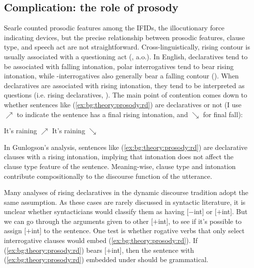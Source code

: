 


\subsection{Complication: the role of prosody}
\label{sec:bg:theory:prosody}

Searle counted prosodic features among the IFIDs, the illocutionary force indicating devices, but the
precise relationship between prosodic features, clause type, and speech act are not straightforward. Cross-linguistically, rising contour is usually associated with a questioning act (\citealt{bolinger1978, ladd1981, gussenhovenchen2000, ladd2001typology}, a.o.). In English, declaratives tend to be associated with falling intonation, polar interrogatives tend to bear rising intonation, while \twh-interrogatives also generally bear a falling contour (\citealt{ladd1981, hedberg2014corpus}). When declaratives are associated with rising intonation, they tend to be interpreted as questions (i.e. rising declaratives, \citealt{ladd1981,gunlogson2004,gunlogson2008,jeong2018,rudin2018,goodhue2021rd}). The main point of contention comes down to whether sentences like (\ref{ex:bg:theory:prosody:rd}) are declaratives or not (I use $\nearrow$ to indicate the sentence has a final rising intonation, and $\searrow$ for final fall):
 
It's raining $\nearrow$
\eex
{}
It's raining $\searrow$
\eex


In Gunlogson's \cite*{gunlogson2008} analysis, sentences like (\ref{ex:bg:theory:prosody:rd}) are declarative clauses with a rising intonation, implying that intonation does not affect the clause type feature of the sentence. Meaning-wise, clause type and intonation contribute compositionally to the discourse function of the utterance. 


Many analyses of rising declaratives in the dynamic discourse tradition adopt the same assumption. As these cases are rarely discussed in syntactic literature, it is unclear whether syntacticians would classify them as having [$-$int] or [$+$int]. But we can go through the arguments given to other [$+$int], to see if it's possible to assign [$+$int] to the sentence. One test is whether rogative verbs that only select interrogative clauses would embed (\ref{ex:bg:theory:prosody:rd}). If (\ref{ex:bg:theory:prosody:rd}) bears [+int], then the sentence with (\ref{ex:bg:theory:prosody:rd}) embedded under  should be grammatical.

